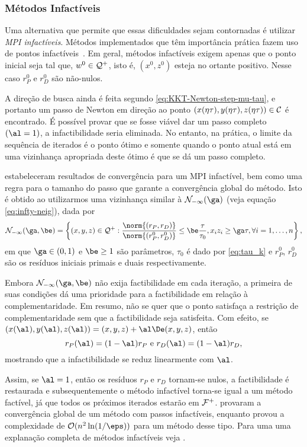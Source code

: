 \subsubsection{Métodos Infactíveis}
Uma alternativa que  permite que essas dificuldades sejam contornadas é utilizar
\emph{\ac{MPI} infactíveis}. Métodos implementados que têm importância
prática fazem uso de pontos
infactíveis~\cite{Gondzio:1996uw,Gertz:2003ji,Czyzyk:1999hk}. Em geral, métodos
infactíveis exigem apenas que  o ponto inicial seja tal que, $w^0\in\mathcal{Q}^+$,
isto é, $(x^0,z^0)$ esteja no ortante positivo. Nesse caso  $r_P^0$ e $r_D^0$
são não-nulos.


A direção de busca ainda é feita segundo \eqref{eq:KKT-Newton-step-mu-tau}, e
portanto  um passo de Newton em direção ao ponto
$(x({\eta\tau}),y({\eta\tau}),z({\eta\tau}))\in\mathcal{C}$ é encontrado. É possível provar
que se fosse viável dar um passo completo  $(\al=1)$,  a
infactibilidade seria eliminada. No entanto, na prática,  o limite da sequência
de iterados é o ponto ótimo e somente quando o ponto atual está em uma
vizinhança apropriada deste ótimo é que se dá um passo completo.

\textcite{Kojima:1993fe}
estabeleceram resultados de convergência para um \ac{MPI} infactível, bem como uma regra para o
tamanho do passo que garante a convergência global do método. Isto é obtido ao
utilizarmos uma vizinhança similar à $\Nset_{-\infty}(\ga)$ (veja equação \eqref{eq:infty-neig}), dada por 
\begin{equation}
\label{eq:infeasible-infty-neig}
\Nset_{-\infty}(\ga,\be) = \left\{(x,y,z) \in\Qset^+ :\frac{\norm{(r_P,r_D)}}{\norm{(r^0_P,r^0_D)}} \leq
\be\frac{\tau}{\tau_0}, 
x_iz_i\geq \ga\tau,\forall i =1,\dotsc,n \right\}, 
\end{equation}
em que $\ga \in(0,1)$ e $\be\geq 1$ são
parâmetros, $\tau_0$ é dado por \eqref{eq:tau_k} e  $r^0_P$, $r^0_D$ são os
resíduos iniciais primais e duais respectivamente.

 
Embora $\Nset_{-\infty}(\ga,\be)$ não exija factibilidade em cada iteração, a primeira de suas condições dá uma prioridade para a factibilidade em relação à complementaridade. Em resumo, não se quer que o ponto satisfaça a restrição de complementaridade sem que a factibilidade seja satisfeita. Com efeito, se
$(x(\al),y(\al),z(\al)) = (x,y,z) + \al\De(x,y,z)$, então 
\[
r_P(\al) = (1-\al)r_P \text{ e } 
r_D(\al) = (1-\al)r_D,
\]
mostrando que a infactibilidade se reduz linearmente com $\al$.  

Assim, se $\al
= 1$, então os resíduos $r_P$ e $r_D$ tornam-se nulos,  a factibilidade é
restaurada e  subsequentemente o método infactível torna-se igual a um método
factível, já que todos os próximos iterados estarão em $\mathcal{F}^+$.
\textcite{Kojima:1993fe} provaram a convergência global de um método com passos
infactíveis, enquanto \textcite{Zhang:2006ic} provou  a complexidade  de $\Oset(
n^2 \ln ( 1/\eps ) )$ para um método desse tipo. Para uma uma explanação
completa de métodos infactíveis veja \textcite[cap. 6]{Wright:Primal-dual-interior-point:1997h}. 



